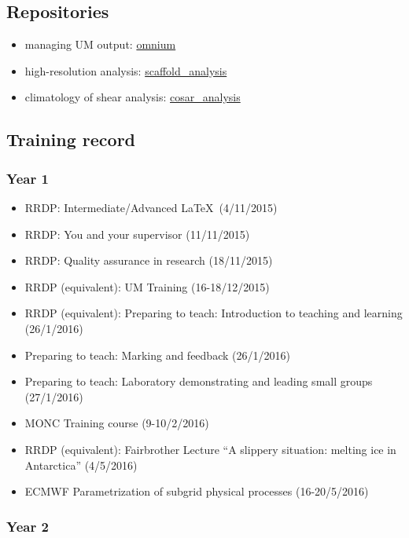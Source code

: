 \documentclass[11pt,a4paper]{article}
\begin{document}
\subsection*{Repositories}

\begin{itemize}
  \item managing UM output: \href{https://github.com/markmuetz/omnium}{omnium}
  \item high-resolution analysis: \href{https://github.com/markmuetz/scaffold_analysis}{scaffold\_analysis}
  \item climatology of shear analysis: \href{https://github.com/markmuetz/cosar_analysis}{cosar\_analysis}
\end{itemize}

\subsection*{Training record}
\subsubsection*{Year 1}

\begin{itemize}
  \item RRDP: Intermediate/Advanced \LaTeX\ (4/11/2015)
  \item RRDP: You and your supervisor (11/11/2015)
  \item RRDP: Quality assurance in research (18/11/2015)
  \item RRDP (equivalent): UM Training (16-18/12/2015)
  \item RRDP (equivalent): Preparing to teach: Introduction to teaching and learning (26/1/2016)
  \item Preparing to teach: Marking and feedback (26/1/2016)
  \item Preparing to teach: Laboratory demonstrating and leading small groups (27/1/2016)
  \item MONC Training course (9-10/2/2016)
  \item RRDP (equivalent): Fairbrother Lecture ``A slippery situation: melting ice in Antarctica'' (4/5/2016)
  \item ECMWF Parametrization of subgrid physical processes (16-20/5/2016)
\end{itemize}

\subsubsection*{Year 2}
\end{document}
